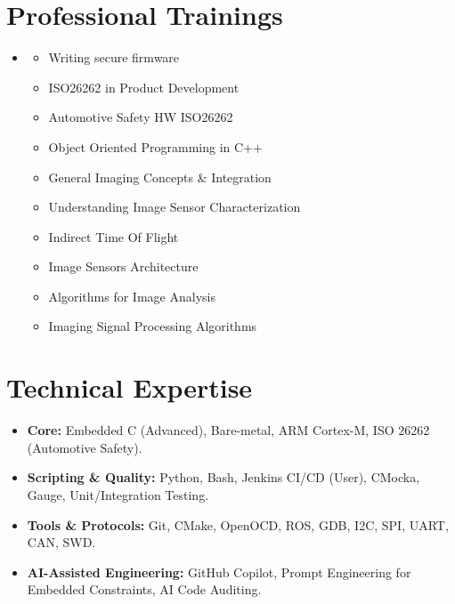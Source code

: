 \documentclass[letterpaper,11pt]{article}
\def\vspaceAfterBullets{1pt} %
\def\bulletIndent{15pt} %
\newcommand{\bulletItem}[1]{
  \item\small{
    {#1}
  }
}
\newcommand{\sectionListStart}{\begin{itemize}[leftmargin=0pt, label={}]}
\newcommand{\sectionListEnd}{\end{itemize}}
\newcommand{\outerBulletListStart}{\begin{itemize}[leftmargin=\bulletIndent]}
\newcommand{\outerBulletListEnd}{\end{itemize}\vspace{\vspaceAfterBullets}}
\begin{document}
\section{Professional Trainings}
\sectionListStart
\bulletItem{\empty}
\outerBulletListStart
\bulletItem{Writing secure firmware}
\bulletItem{ISO26262 in Product Development}
\bulletItem{Automotive Safety HW ISO26262}
\bulletItem{Object Oriented Programming in C++}
\bulletItem{General Imaging Concepts \& Integration}
\bulletItem{Understanding Image Sensor Characterization}
\bulletItem{Indirect Time Of Flight}
\bulletItem{Image Sensors Architecture}
\bulletItem{Algorithms for Image Analysis}
\bulletItem{Imaging Signal Processing Algorithms}
\outerBulletListEnd
\sectionListEnd
\vspace{0.25em} %

\section{Technical Expertise}
\sectionListStart
\bulletItem{\textbf{Core:} Embedded C (Advanced), Bare-metal, ARM Cortex-M, ISO 26262 (Automotive Safety).}
\bulletItem{\textbf{Scripting \& Quality:} Python, Bash, Jenkins CI/CD (User), CMocka, Gauge, Unit/Integration Testing.}
\bulletItem{\textbf{Tools \& Protocols:} Git, CMake, OpenOCD, ROS, GDB, I2C, SPI, UART, CAN, SWD.}
\bulletItem{\textbf{AI-Assisted Engineering:} GitHub Copilot, Prompt Engineering for Embedded Constraints, AI Code Auditing.}
\sectionListEnd
\vspace{1em} %

\end{document}
